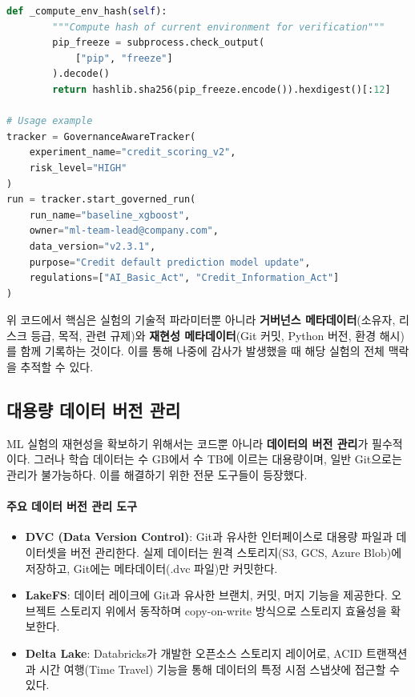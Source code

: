 \begin{lstlisting}[language=Python, caption={MLflow Experiment Tracking with Governance Metadata}, label={lst:mlflow_governance_platform}]
    def _compute_env_hash(self):
        """Compute hash of current environment for verification"""
        pip_freeze = subprocess.check_output(
            ["pip", "freeze"]
        ).decode()
        return hashlib.sha256(pip_freeze.encode()).hexdigest()[:12]

# Usage example
tracker = GovernanceAwareTracker(
    experiment_name="credit_scoring_v2",
    risk_level="HIGH"
)
run = tracker.start_governed_run(
    run_name="baseline_xgboost",
    owner="ml-team-lead@company.com",
    data_version="v2.3.1",
    purpose="Credit default prediction model update",
    regulations=["AI_Basic_Act", "Credit_Information_Act"]
)
\end{lstlisting}

위 코드에서 핵심은 실험의 기술적 파라미터뿐 아니라 \textbf{거버넌스 메타데이터}(소유자, 리스크 등급, 목적, 관련 규제)와 \textbf{재현성 메타데이터}(Git 커밋, Python 버전, 환경 해시)를 함께 기록하는 것이다. 이를 통해 나중에 감사가 발생했을 때 해당 실험의 전체 맥락을 추적할 수 있다\cite{kreuzberger2023machine}.

\subsection{대용량 데이터 버전 관리}
\label{sec:14.2.3}

ML 실험의 재현성을 확보하기 위해서는 코드뿐 아니라 \textbf{데이터의 버전 관리}가 필수적이다. 그러나 학습 데이터는 수 GB에서 수 TB에 이르는 대용량이며, 일반 Git으로는 관리가 불가능하다. 이를 해결하기 위한 전문 도구들이 등장했다.

\paragraph{주요 데이터 버전 관리 도구}

\begin{itemize}
    \item \textbf{DVC (Data Version Control)}: Git과 유사한 인터페이스로 대용량 파일과 데이터셋을 버전 관리한다. 실제 데이터는 원격 스토리지(S3, GCS, Azure Blob)에 저장하고, Git에는 메타데이터(.dvc 파일)만 커밋한다.
    \item \textbf{LakeFS}: 데이터 레이크에 Git과 유사한 브랜치, 커밋, 머지 기능을 제공한다. 오브젝트 스토리지 위에서 동작하며 copy-on-write 방식으로 스토리지 효율성을 확보한다.
    \item \textbf{Delta Lake}: Databricks가 개발한 오픈소스 스토리지 레이어로, ACID 트랜잭션과 시간 여행(Time Travel) 기능을 통해 데이터의 특정 시점 스냅샷에 접근할 수 있다.
\end{itemize}

